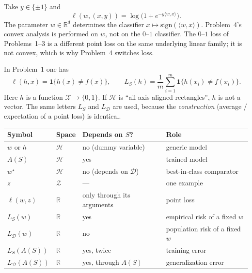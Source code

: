 \begin{example}
\label{exmp:mlu-logistic}
Take $y\in\{\pm1\}$ and
\[
\ell(w,(x,y))
=
\log\bigl(1+e^{-y\langle w,x\rangle}\bigr).
\]
The parameter $w\in\mathbb{R}^d$ determines the classifier $x\mapsto\mathrm{sign}(\langle w,x\rangle)$. Problem~4's convex analysis is performed on $w$, not on the $0$--$1$ classifier. The $0$--$1$ loss of Problems~1--3 is a different point loss on the same underlying linear family; it is not convex, which is why Problem~4 switches loss.
\end{example}

\begin{example}
\label{exmp:mlu-01}
In Problem~1 one has
\[
\ell(h,x)=\mathbf{1}\{h(x)\ne f(x)\},
\qquad
L_S(h)=\frac1m\sum_{i=1}^m\mathbf{1}\{h(x_i)\ne f(x_i)\}.
\]
Here $h$ is a function $\mathcal{X}\to\{0,1\}$. If $\mathcal{H}$ is ``all axis-aligned rectangles'', $h$ is not a vector. The same letters $L_S$ and $L_{\mathcal{D}}$ are used, because the \emph{construction} (average / expectation of a point loss) is identical.
\end{example}

\begin{center}
\begin{tabular}{|l|l|l|l|}
\hline
\textbf{Symbol} & \textbf{Space} & \textbf{Depends on $S$?} & \textbf{Role} \\ \hline
$w$ or $h$ & $\mathcal{H}$ & no (dummy variable) & generic model \\ \hline
$A(S)$ & $\mathcal{H}$ & yes & trained model \\ \hline
$w^\star$ & $\mathcal{H}$ & no (depends on $\mathcal{D}$) & best-in-class comparator \\ \hline
$z$ & $\mathcal{Z}$ & --- & one example \\ \hline
$\ell(w,z)$ & $\mathbb{R}$ & only through its arguments & point loss \\ \hline
$L_S(w)$ & $\mathbb{R}$ & yes & empirical risk of a fixed $w$ \\ \hline
$L_{\mathcal{D}}(w)$ & $\mathbb{R}$ & no & population risk of a fixed $w$ \\ \hline
$L_S(A(S))$ & $\mathbb{R}$ & yes, twice & training error \\ \hline
$L_{\mathcal{D}}(A(S))$ & $\mathbb{R}$ & yes, through $A(S)$ & generalization error \\ \hline
\end{tabular}
\end{center}

